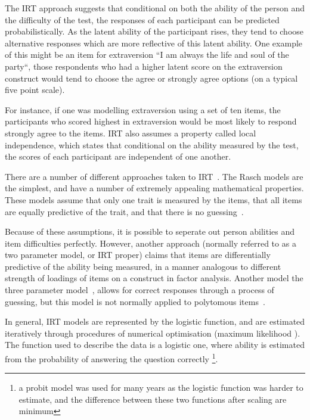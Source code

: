 The IRT approach suggests that conditional on both the ability of the person and the difficulty of the test, the responses of each participant can be predicted probabilistically. As the latent ability of the participant rises, they tend to choose alternative responses which are more reflective of this latent ability. One example of this might be an item for extraversion ``I am always the life and soul of the party``, those respondents who had a higher latent score on the extraversion construct would tend to choose the agree or strongly agree options (on a typical five point scale). 

For instance, if one was modelling extraversion using a set of ten items, the participants who scored highest in extraversion would be most likely to respond strongly agree to the items.  IRT also assumes a property called local independence, which states that conditional on the ability measured by the test, the scores of each participant are independent of one another.

There are a number of different approaches taken to IRT~\cite{van1997handbook,fischer1995rasch}. The  Rasch models are the simplest, and have a number of extremely appealing mathematical properties. These models assume that only one trait is measured by the items, that all items are equally predictive of the trait, and that there is no guessing~\cite{van1997handbook}.

Because of these assumptions, it is possible to seperate out person abilities and item difficulties perfectly. However, another approach (normally referred to as a two parameter model, or IRT proper) claims that items are differentially predictive of the ability being measured, in a manner analogous to different strength of loadings of items on a construct in factor analysis. Another model the three parameter model~\cite{lord1968statistical}, allows for correct responses through a process of guessing, but this model is not normally applied to polytomous items~\cite{van1997handbook,Mair2010}.


In general, IRT models are represented by the logistic function, and are estimated iteratively through procedures of numerical optimisation (maximum likelihood \cite{fischer1995rasch}). The function used to describe the data is a logistic one, where ability is estimated from the probability of answering the question correctly \footnote{a probit model was used for many years as the logistic function was harder to estimate, and the difference between these two functions after scaling are minimum}.

